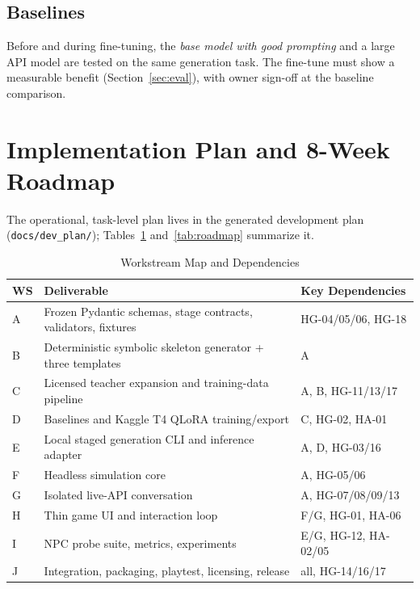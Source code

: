 \documentclass[11pt,a4paper]{article}
\providecommand{\toprule}{\hline\hline}
\providecommand{\midrule}{\hline}
\providecommand{\bottomrule}{\hline\hline}
\begin{document}
\subsection{Baselines}
Before and during fine-tuning, the \emph{base model with good prompting} and a large API model are tested on the same generation task. The fine-tune must show a measurable benefit (Section~\ref{sec:eval}), with owner sign-off at the baseline comparison.

\section{Implementation Plan and 8-Week Roadmap}

The operational, task-level plan lives in the generated development plan (\texttt{docs/dev\_plan/}); Tables~\ref{tab:workstreams} and~\ref{tab:roadmap} summarize it.

\begin{table}[htbp]
\centering
\small
\caption{Workstream Map and Dependencies}
\label{tab:workstreams}
\begin{tabularx}{\textwidth}{llX}
\toprule
\textbf{WS} & \textbf{Deliverable} & \textbf{Key Dependencies} \\
\midrule
A & Frozen Pydantic schemas, stage contracts, validators, fixtures & HG-04/05/06, HG-18 \\
B & Deterministic symbolic skeleton generator + three templates & A \\
C & Licensed teacher expansion and training-data pipeline & A, B, HG-11/13/17 \\
D & Baselines and Kaggle T4 QLoRA training/export & C, HG-02, HA-01 \\
E & Local staged generation CLI and inference adapter & A, D, HG-03/16 \\
F & Headless simulation core & A, HG-05/06 \\
G & Isolated live-API conversation & A, HG-07/08/09/13 \\
H & Thin game UI and interaction loop & F/G, HG-01, HA-06 \\
I & NPC probe suite, metrics, experiments & E/G, HG-12, HA-02/05 \\
J & Integration, packaging, playtest, licensing, release & all, HG-14/16/17 \\
\bottomrule
\end{tabularx}
\end{table}
\end{document}
